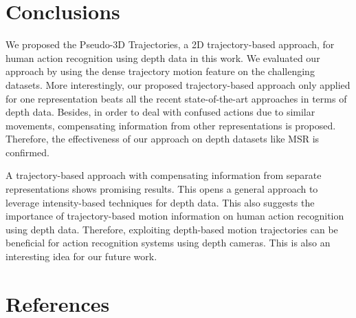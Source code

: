 \documentclass[final,3p,times,twocolumn]{elsarticle}
\begin{document}
\section{Conclusions}
\label{lbl:Conclusions}

We proposed the Pseudo-3D Trajectories, a 2D trajectory-based approach, for human action recognition using depth data in this work. We evaluated our approach by using the dense trajectory motion feature on the challenging datasets. More interestingly, our proposed trajectory-based approach only applied for one representation beats all the recent state-of-the-art approaches in terms of depth data. Besides, in order to deal with confused actions due to similar movements, compensating information from other representations is proposed. Therefore, the effectiveness of our approach on depth datasets like MSR is confirmed.

A trajectory-based approach with compensating information from separate representations shows promising results. This opens a general approach to leverage intensity-based techniques for depth data. This also suggests the importance of trajectory-based motion information on human action recognition using depth data. Therefore, exploiting depth-based motion trajectories can be beneficial for action recognition systems using depth cameras. This is also an interesting idea for our future work.

\section*{References}



\end{document}
